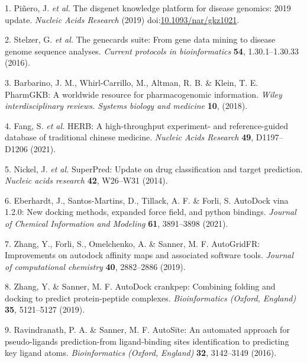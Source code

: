 \documentclass[
]{article}
\newenvironment{cslreferences}%
  {}%
  {\par}
\begin{document}
\hypertarget{refs}{}
\begin{cslreferences}
\leavevmode\hypertarget{ref-TheDisgenetKnPinero2019}{}%
1. Piñero, J. \emph{et al.} The disgenet knowledge platform for disease genomics: 2019 update. \emph{Nucleic Acids Research} (2019) doi:\href{https://doi.org/10.1093/nar/gkz1021}{10.1093/nar/gkz1021}.

\leavevmode\hypertarget{ref-TheGenecardsSStelze2016}{}%
2. Stelzer, G. \emph{et al.} The genecards suite: From gene data mining to disease genome sequence analyses. \emph{Current protocols in bioinformatics} \textbf{54}, 1.30.1--1.30.33 (2016).

\leavevmode\hypertarget{ref-PharmgkbAWorBarbar2018}{}%
3. Barbarino, J. M., Whirl-Carrillo, M., Altman, R. B. \& Klein, T. E. PharmGKB: A worldwide resource for pharmacogenomic information. \emph{Wiley interdisciplinary reviews. Systems biology and medicine} \textbf{10}, (2018).

\leavevmode\hypertarget{ref-HerbAHighThFang2021}{}%
4. Fang, S. \emph{et al.} HERB: A high-throughput experiment- and reference-guided database of traditional chinese medicine. \emph{Nucleic Acids Research} \textbf{49}, D1197--D1206 (2021).

\leavevmode\hypertarget{ref-SuperpredUpdaNickel2014}{}%
5. Nickel, J. \emph{et al.} SuperPred: Update on drug classification and target prediction. \emph{Nucleic acids research} \textbf{42}, W26--W31 (2014).

\leavevmode\hypertarget{ref-AutodockVina1Eberha2021}{}%
6. Eberhardt, J., Santos-Martins, D., Tillack, A. F. \& Forli, S. AutoDock vina 1.2.0: New docking methods, expanded force field, and python bindings. \emph{Journal of Chemical Information and Modeling} \textbf{61}, 3891--3898 (2021).

\leavevmode\hypertarget{ref-AutogridfrImpZhang2019}{}%
7. Zhang, Y., Forli, S., Omelchenko, A. \& Sanner, M. F. AutoGridFR: Improvements on autodock affinity maps and associated software tools. \emph{Journal of computational chemistry} \textbf{40}, 2882--2886 (2019).

\leavevmode\hypertarget{ref-AutodockCrankpZhang2019}{}%
8. Zhang, Y. \& Sanner, M. F. AutoDock crankpep: Combining folding and docking to predict protein-peptide complexes. \emph{Bioinformatics (Oxford, England)} \textbf{35}, 5121--5127 (2019).

\leavevmode\hypertarget{ref-AutositeAnAuRavind2016}{}%
9. Ravindranath, P. A. \& Sanner, M. F. AutoSite: An automated approach for pseudo-ligands prediction-from ligand-binding sites identification to predicting key ligand atoms. \emph{Bioinformatics (Oxford, England)} \textbf{32}, 3142--3149 (2016).


\end{cslreferences}
\end{document}
